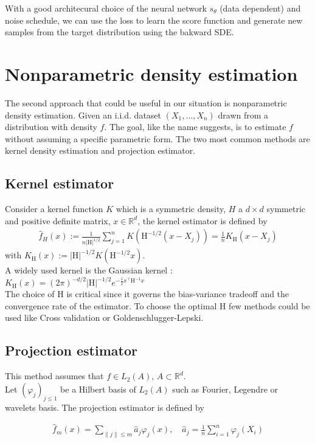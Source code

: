 \documentclass{article}
\begin{document}
With a good architecural choice of the neural network \(s_\theta\) (data dependent) and noise schedule, we can use the loss to learn the score function and generate new samples from the target distribution using the bakward SDE.


\section{Nonparametric density estimation}
The second approach that could be useful in our situation is nonparametric density estimation. Given an i.i.d. dataset \((X_1,\ldots,X_n)\) drawn from a distribution with density \(f\). The goal, like the name suggests, is to estimate \(f\) without assuming a specific parametric form. The two most common methods are kernel density estimation and projection estimator. 

\subsection{Kernel estimator}
Consider a kernel function \(K\) which is a symmetric density, \(H\) a \(d\times d\) symmetric and positive definite matrix, \(x\in\mathbb{R}^d\), the kernel estimator is defined by 
\begin{align}
\hat{f}_H(x):=\frac{1}{n|\mathrm{H}|^{1/2}}\sum_{j=1}^n K\left(\mathrm{H}^{-1/2}(x-X_j)\right)=\frac{1}{n}K_\mathrm{H}\left(x-X_j\right)
\end{align}
with \(K_\mathrm{H}(x):= |\mathrm{H}|^{-1/2}K(\mathrm{H}^{-1/2}x)\). \\
A widely used kernel is the Gaussian kernel : \(K_\textrm{H}(x)=(2\pi)^{-d/2}|\textrm{H}|^{-1/2}e^{-\frac{1}{2} x^\intercal \textrm{H}^{-1} x}\) \\
The choice of \(\mathrm{H}\) is critical since it governs the bias-variance tradeoff and the convergence rate of the estimator. To choose the optimal \(\mathrm{H}\) few methods could be used like Cross validation or Goldenschlugger-Lepski.

\subsection{Projection estimator}
This method assumes that \(f\in L_2(A), \, A\subset \mathbb{R}^d\). \\
Let \((\varphi_j)_{j\le 1}\) be a Hilbert basis of \(L_2(A)\) such as Fourier, Legendre or wavelets basis. The projection estimator is defined by 

\begin{align}
    \hat{f}_m(x)=\sum_{\|j\|\le m} \hat{a}_j\varphi_j(x), \quad \hat{a}_j=\frac{1}{n}\sum_{i=1}^n \varphi_j(X_i)
\end{align}
\end{document}
